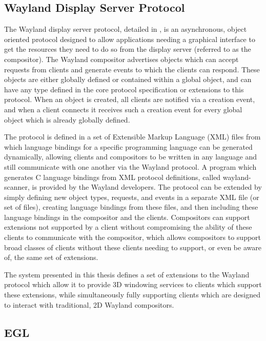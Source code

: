 \subsection{Wayland Display Server Protocol}
\label{sec:wayland-protocol}

The Wayland display server protocol, detailed in \cite{wayland-protocol}, is an asynchronous, object oriented protocol designed to allow applications needing a graphical interface to get the resources they need to do so from the display server (referred to as the compositor). The Wayland compositor advertises objects which can accept requests from clients and generate events to which the clients can respond. These objects are either globally defined or contained within a global object, and can have any type defined in the core protocol specification or extensions to this protocol. When an object is created, all clients are notified via a creation event, and when a client connects it receives such a creation event for every global object which is already globally defined.

The protocol is defined in a set of Extensible Markup Language (XML) files from which language bindings for a specific programming language can be generated dynamically, allowing clients and compositors to be written in any language and still communicate with one another via the Wayland protocol. A program which generates C language bindings from XML protocol definitions, called wayland-scanner, is provided by the Wayland developers. The protocol can be extended by simply defining new object types, requests, and events in a separate XML file (or set of files), creating language bindings from these files, and then including these language bindings in the compositor and the clients. Compositors can support extensions not supported by a client without compromising the ability of these clients to communicate with the compositor, which allows compositors to support broad classes of clients without these clients needing to support, or even be aware of, the same set of extensions.

The system presented in this thesis defines a set of extensions to the Wayland protocol which allow it to provide 3D windowing services to clients which support these extensions, while simultaneously fully supporting clients which are designed to interact with traditional, 2D Wayland compositors.

\subsection{EGL}
\label{sec:egl}

